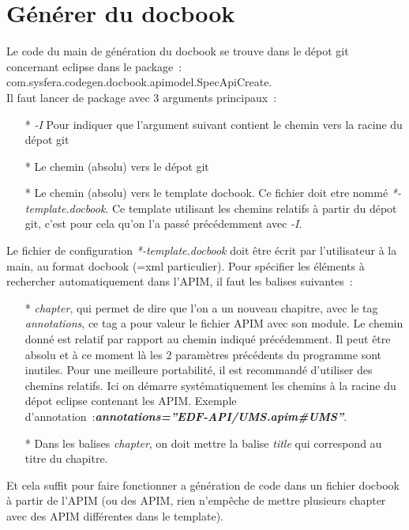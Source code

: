 \documentclass{article}
\begin{document}
\section*{G\'en\'erer du docbook}
Le code du main de g\'en\'eration du docbook se trouve dans le d\'epot git concernant eclipse dans le package~:\\
com.sysfera.codegen.docbook.apimodel.SpecApiCreate. \\
Il faut lancer de package avec 3 arguments principaux~:
\begin{itemize}
\item[*] \textit{-I} Pour indiquer que l'argument suivant contient le chemin vers la racine du d\'epot git
\item[*] Le chemin (absolu) vers le d\'epot git
\item[*] Le chemin (absolu) vers le template docbook. Ce fichier doit etre nomm\'e \textit{*-template.docbook}. Ce template utilisant les chemins relatifs \`a partir du d\'epot git, c'est pour cela qu'on l'a pass\'e pr\'ec\'edemment avec \textit{-I}.
\end{itemize}

Le fichier de configuration \textit{*-template.docbook} doit \^etre \'ecrit par l'utilisateur \`a la main, au format docbook (=xml particulier). Pour sp\'ecifier les \'el\'ements \`a rechercher automatiquement dans l'APIM, il faut les balises suivantes~:
\begin{itemize}
\item[*] \textit{chapter}, qui permet de dire que l'on a un nouveau chapitre, avec le tag \textit{annotations}, ce tag a pour valeur le fichier APIM avec son module. Le chemin donn\'e est relatif par rapport au chemin indiqu\'e pr\'ec\'edemment. Il peut \^etre absolu et \`a ce moment l\`a les 2 param\`etres pr\'ec\'edents du programme sont inutiles. Pour une meilleure portabilit\'e, il est recommand\'e d'utiliser des chemins relatifs. Ici on d\'emarre syst\'ematiquement les chemins \`a la racine du d\'epot eclipse contenant les APIM. Exemple d'annotation~:\textit{\textbf{annotations=''EDF-API/UMS.apim\#UMS''}}.
\item[*] Dans les balises \textit{chapter}, on doit mettre la balise \textit{title} qui correspond au titre du chapitre.
\end{itemize}
Et cela suffit pour faire fonctionner a g\'en\'eration de code dans un fichier docbook \`a partir de l'APIM (ou des APIM, rien n'emp\^eche de mettre plusieurs chapter avec des APIM diff\'erentes dans le template).
\end{document}
